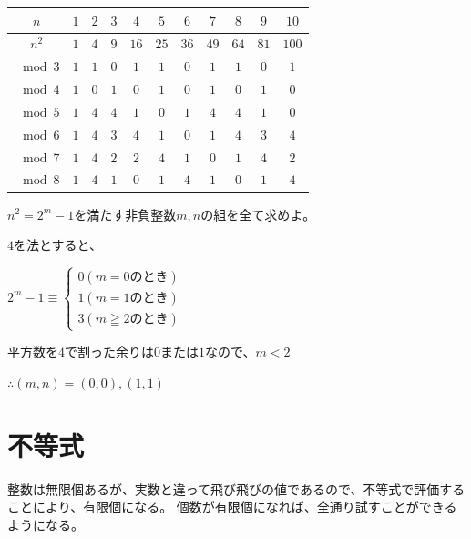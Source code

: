 \documentclass[uplatex,dvipdfmx]{jsbook}
\begin{document}
\begin{table}[h]
    \begin{tabular}{|c||c|c|c|c|c|c|c|c|c|c|}
        \hline
        $n$ & $1$ & $2$ & $3$ & $4$ & $5$ & $6$ & $7$ & $8$ & $9$ & $10$\\\hline
        $n^2$ & $1$ & $4$ & $9$ & $16$ & $25$ & $36$ & $49$ & $64$ & $81$ & $100$\\\hline
        $\mod 3$ & $1$ & $1$ & $0$ & $1$ & $1$ & $0$ & $1$ & $1$ & $0$ & $1$\\\hline
        $\mod 4$ & $1$ & $0$ & $1$ & $0$ & $1$ & $0$ & $1$ & $0$ & $1$ & $0$\\\hline
        $\mod 5$ & $1$ & $4$ & $4$ & $1$ & $0$ & $1$ & $4$ & $4$ & $1$ & $0$\\\hline
        $\mod 6$ & $1$ & $4$ & $3$ & $4$ & $1$ & $0$ & $1$ & $4$ & $3$ & $4$\\\hline
        $\mod 7$ & $1$ & $4$ & $2$ & $2$ & $4$ & $1$ & $0$ & $1$ & $4$ & $2$\\\hline
        $\mod 8$ & $1$ & $4$ & $1$ & $0$ & $1$ & $4$ & $1$ & $0$ & $1$ & $4$\\\hline
    \end{tabular}
\end{table}

\begin{problem}[練習問題]
    $n^2=2^m-1$を満たす非負整数$m,n$の組を全て求めよ。
\end{problem}

\begin{answer}
    $4$を法とすると、

    $2^m-1\equiv
    \begin{cases}
        0\left(m=0\text{のとき}\right)\\
        1\left(m=1\text{のとき}\right)\\
        3\left(m\geqq 2\text{のとき}\right)
    \end{cases}$

    平方数を$4$で割った余りは$0$または$1$なので、$m<2$

    $\therefore\left(m,n\right)=\left(0,0\right),\left(1,1\right)$
\end{answer}

\section{不等式}
整数は無限個あるが、実数と違って飛び飛びの値であるので、不等式で評価することにより、有限個になる。
個数が有限個になれば、全通り試すことができるようになる。
\end{document}

